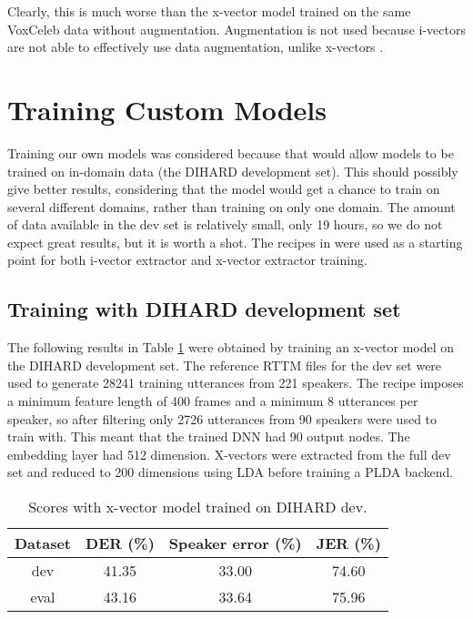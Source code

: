 		Clearly, this is much worse than the x-vector model trained on the same VoxCeleb data without augmentation. Augmentation is not used because i-vectors are not able to effectively use data augmentation, unlike x-vectors \cite{snyder2018x}.
	
	\section{Training Custom Models}
	Training our own models was considered because that would allow models to be trained on in-domain data (the DIHARD development set). This should possibly give better results, considering that the model would get a chance to train on several different domains, rather than training on only one domain. The amount of data available in the dev set is relatively small, only 19 hours, so we do not expect great results, but it is worth a shot. The recipes in  were used as a starting point for both i-vector extractor and x-vector extractor training.
	
		\subsection{Training with DIHARD development set}
			The following results in Table \ref{table-dev-xvec} were obtained by training an x-vector model on the DIHARD development set. The reference RTTM files for the dev set were used to generate 28241 training utterances from 221 speakers. The recipe imposes a minimum feature length of 400 frames and a minimum 8 utterances per speaker, so after filtering only 2726 utterances from 90 speakers were used to train with. This meant that the trained DNN had 90 output nodes. The embedding layer had 512 dimension. X-vectors were extracted from the full dev set and reduced to 200 dimensions using LDA before training a PLDA backend.
			\begin{table}[h]
				\centering
				\begin{tabular}{|c|c|c|c|}
					\hline
					Dataset & DER (\%) & Speaker error (\%) & JER (\%) \\
					\hline
					dev & 41.35 & 33.00 & 74.60 \\
					\hline
					eval & 43.16 & 33.64 & 75.96 \\
					\hline
				\end{tabular}
				\caption{Scores with x-vector model trained on DIHARD dev.}
				\label{table-dev-xvec}
			\end{table}
		
